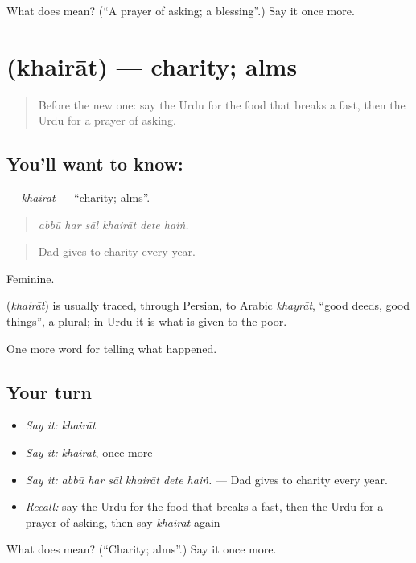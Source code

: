 \begin{tcolorbox}[breakable,colback=teal!4,colframe=teal!35!black,title={Before you move on}]
What does  mean? (\textquotedblleft{}A prayer of asking; a blessing\textquotedblright{}.) Say it once more.
\end{tcolorbox}
\section[\texorpdfstring{\ur{خیرات} (khairāt)}{خیرات (khairāt)}]{ (khairāt) — charity; alms}

\label{lesson:UR-C322-khairat}



\begin{quote}
Before the new one: say the Urdu for the food that breaks a fast, then the Urdu for a prayer of asking.
\end{quote}

\subsection*{You'll want to know: }
\textbf{} — \emph{khairāt} — \textquotedblleft{}charity; alms\textquotedblright{}.

\begin{quote}
     
\end{quote}

\begin{quote}
\emph{abbū har sāl khairāt dete haiṅ.}
\end{quote}

\begin{quote}
Dad gives to charity every year.
\end{quote}

Feminine.

\begin{cousinweb}
\textbf{} (\emph{khairāt}) is usually traced, through Persian, to Arabic \emph{khayrāt}, \textquotedblleft{}good deeds, good things\textquotedblright{}, a plural; in Urdu it is what is given to the poor.
\end{cousinweb}

\begin{grammarlens}[title={What you've built}]
One more word for telling what happened.
\end{grammarlens}

\subsection*{Your turn}
\begin{itemize}
\raggedright
  \item \emph{Say it:} \emph{khairāt}
  \item \emph{Say it:} \emph{khairāt}, once more
  \item \emph{Say it:} \emph{abbū har sāl khairāt dete haiṅ.} — Dad gives to charity every year.
  \item \emph{Recall:} say the Urdu for the food that breaks a fast, then the Urdu for a prayer of asking, then say \emph{khairāt} again
\end{itemize}

\begin{tcolorbox}[breakable,colback=teal!4,colframe=teal!35!black,title={Before you move on}]
What does  mean? (\textquotedblleft{}Charity; alms\textquotedblright{}.) Say it once more.
\end{tcolorbox}
